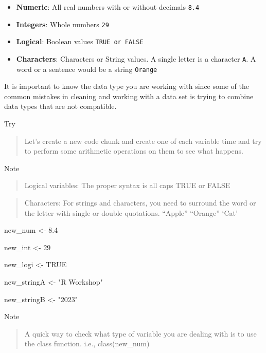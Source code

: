 \documentclass[
]{book}
\newenvironment{Shaded}{\begin{snugshade}}{\end{snugshade}}
\newcommand{\ConstantTok}[1]{\textcolor[rgb]{0.00,0.00,0.00}{#1}}
\newcommand{\DecValTok}[1]{\textcolor[rgb]{0.00,0.00,0.81}{#1}}
\newcommand{\FloatTok}[1]{\textcolor[rgb]{0.00,0.00,0.81}{#1}}
\newcommand{\NormalTok}[1]{#1}
\newcommand{\OtherTok}[1]{\textcolor[rgb]{0.56,0.35,0.01}{#1}}
\newcommand{\StringTok}[1]{\textcolor[rgb]{0.31,0.60,0.02}{#1}}
\begin{document}
\begin{itemize}
\item
  \textbf{Numeric}: All real numbers with or without decimals \texttt{8.4}
\item
  \textbf{Integers}: Whole numbers \texttt{29}
\item
  \textbf{Logical}: Boolean values \texttt{TRUE\ or\ FALSE}
\item
  \textbf{Characters}: Characters or String values. A single letter is a character \texttt{A}. A word or a sentence would be a string \texttt{Orange}
\end{itemize}

It is important to know the data type you are working with since some of the common mistakes in cleaning and working with a data set is trying to combine data types that are not compatible.

Try

\begin{quote}
Let's create a new code chunk and create one of each variable time and try to perform some arithmetic operations on them to see what happens.
\end{quote}

Note

\begin{quote}
Logical variables: The proper syntax is all caps TRUE or FALSE
\end{quote}

\begin{quote}
Characters: For strings and characters, you need to surround the word or the letter with single or double quotations. ``Apple'' ``Orange'' `Cat'
\end{quote}

\begin{Shaded}
\begin{Highlighting}[]
\NormalTok{new\_num }\OtherTok{\textless{}{-}} \FloatTok{8.4}

\NormalTok{new\_int }\OtherTok{\textless{}{-}} \DecValTok{29}

\NormalTok{new\_logi }\OtherTok{\textless{}{-}} \ConstantTok{TRUE}

\NormalTok{new\_stringA }\OtherTok{\textless{}{-}} \StringTok{"R Workshop"}

\NormalTok{new\_stringB }\OtherTok{\textless{}{-}} \StringTok{"2023"}
\end{Highlighting}
\end{Shaded}

Note

\begin{quote}
A quick way to check what type of variable you are dealing with is to use the class function. i.e., class(new\_num)
\end{quote}
\end{document}
